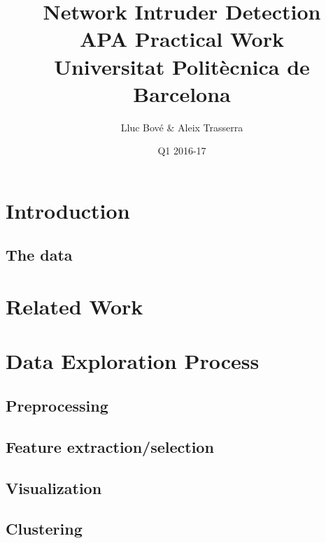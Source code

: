 \documentclass[a4paper]{article} %
\title{Network Intruder Detection \\
\large APA Practical Work \\
Universitat Politècnica de Barcelona} %
\author{Lluc Bové \& Aleix Trasserra} %
\date{Q1 2016-17}
\begin{document}
\maketitle %



\section{Introduction}
\subsection{The data}

\section{Related Work}


\section{Data Exploration Process}
\subsection{Preprocessing}
\subsection{Feature extraction/selection}
\subsection{Visualization}
\subsection{Clustering}







\end{document}
